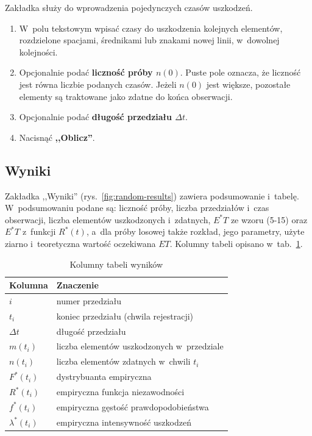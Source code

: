 Zakładka służy do wprowadzenia pojedynczych czasów uszkodzeń.
\begin{enumerate}
  \item W~polu tekstowym wpisać czasy do uszkodzenia kolejnych elementów, rozdzielone
    spacjami, średnikami lub znakami nowej linii, w~dowolnej kolejności.
  \item Opcjonalnie podać \textbf{liczność próby $n(0)$}. Puste pole oznacza, że
    liczność jest równa liczbie podanych czasów. Jeżeli $n(0)$ jest większe, pozostałe
    elementy są traktowane jako zdatne do końca obserwacji.
  \item Opcjonalnie podać \textbf{długość przedziału $\Delta t$}.
  \item Nacisnąć \textbf{,,Oblicz''}.
\end{enumerate}

\subsection{Wyniki}

Zakładka ,,Wyniki'' (rys.~\ref{fig:random-results}) zawiera podsumowanie i~tabelę.
W~podsumowaniu podane są: liczność próby, liczba przedziałów i~czas obserwacji,
liczba elementów uszkodzonych i~zdatnych, $E^*T$ ze wzoru (5-15) oraz $E^*T$
z~funkcji $R^*(t)$, a~dla próby losowej także rozkład, jego parametry, użyte ziarno
i~teoretyczna wartość oczekiwana $ET$. Kolumny tabeli opisano w~tab.~\ref{tab:columns}.

\begin{table}[H]
  \centering
  \caption{Kolumny tabeli wyników}
  \label{tab:columns}
  \small
  \begin{tabular}{@{}ll@{}}
    \toprule
    Kolumna & Znaczenie \\
    \midrule
    $i$ & numer przedziału \\
    $t_i$ & koniec przedziału (chwila rejestracji) \\
    $\Delta t$ & długość przedziału \\
    $m(t_i)$ & liczba elementów uszkodzonych w~przedziale \\
    $n(t_i)$ & liczba elementów zdatnych w~chwili $t_i$ \\
    $F^*(t_i)$ & dystrybuanta empiryczna \\
    $R^*(t_i)$ & empiryczna funkcja niezawodności \\
    $f^*(t_i)$ & empiryczna gęstość prawdopodobieństwa \\
    $\lambda^*(t_i)$ & empiryczna intensywność uszkodzeń \\
    \bottomrule
  \end{tabular}
\end{table}

